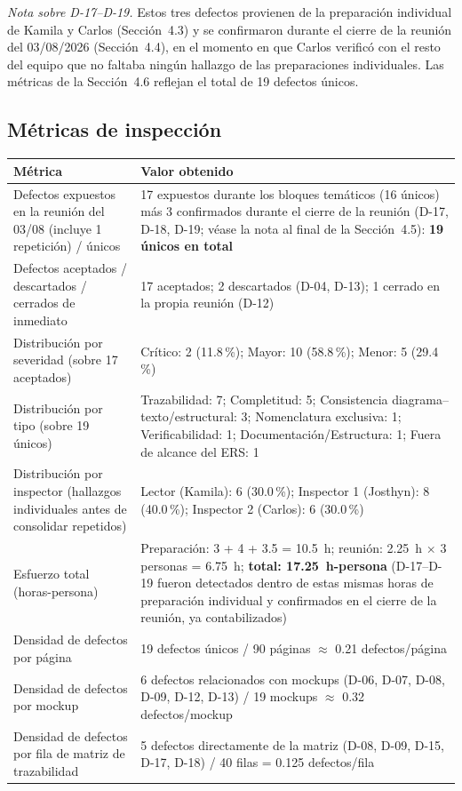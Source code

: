 \documentclass[11pt,a4paper]{article}
\begin{document}
\textit{Nota sobre D-17--D-19.} Estos tres defectos provienen de la preparación individual de Kamila y Carlos (Sección~4.3) y se confirmaron durante el cierre de la reunión del 03/08/2026 (Sección~4.4), en el momento en que Carlos verificó con el resto del equipo que no faltaba ningún hallazgo de las preparaciones individuales. Las métricas de la Sección~4.6 reflejan el total de 19 defectos únicos.

\subsection{Métricas de inspección}

\begin{longtable}{|p{6cm}|p{7.5cm}|}
\hline
\textbf{Métrica} & \textbf{Valor obtenido} \\
\hline
Defectos expuestos en la reunión del 03/08 (incluye 1 repetición) / únicos & 17 expuestos durante los bloques temáticos (16 únicos) más 3 confirmados durante el cierre de la reunión (D-17, D-18, D-19; véase la nota al final de la Sección~4.5): \textbf{19 únicos en total} \\
\hline
Defectos aceptados / descartados / cerrados de inmediato & 17 aceptados; 2 descartados (D-04, D-13); 1 cerrado en la propia reunión (D-12) \\
\hline
Distribución por severidad (sobre 17 aceptados) & Crítico: 2 (11.8\,\%); Mayor: 10 (58.8\,\%); Menor: 5 (29.4\,\%) \\
\hline
Distribución por tipo (sobre 19 únicos) & Trazabilidad: 7; Completitud: 5; Consistencia diagrama--texto/estructural: 3; Nomenclatura exclusiva: 1; Verificabilidad: 1; Documentación/Estructura: 1; Fuera de alcance del ERS: 1 \\
\hline
Distribución por inspector (hallazgos individuales antes de consolidar repetidos) & Lector (Kamila): 6 (30.0\,\%); Inspector 1 (Josthyn): 8 (40.0\,\%); Inspector 2 (Carlos): 6 (30.0\,\%) \\
\hline
Esfuerzo total (horas-persona) & Preparación: 3 + 4 + 3.5 = 10.5~h; reunión: 2.25~h $\times$ 3 personas = 6.75~h; \textbf{total: 17.25~h-persona} (D-17--D-19 fueron detectados dentro de estas mismas horas de preparación individual y confirmados en el cierre de la reunión, ya contabilizados) \\
\hline
Densidad de defectos por página & 19 defectos únicos / 90 páginas $\approx$ 0.21 defectos/página \\
\hline
Densidad de defectos por mockup & 6 defectos relacionados con mockups (D-06, D-07, D-08, D-09, D-12, D-13) / 19 mockups $\approx$ 0.32 defectos/mockup \\
\hline
Densidad de defectos por fila de matriz de trazabilidad & 5 defectos directamente de la matriz (D-08, D-09, D-15, D-17, D-18) / 40 filas = 0.125 defectos/fila \\
\hline
\end{longtable}
\end{document}
